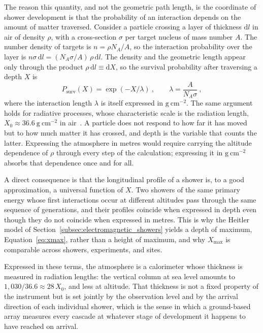 The reason this quantity, and not the geometric path length, is the coordinate of shower development is that the probability of an interaction depends on the amount of matter traversed. Consider a particle crossing a layer of thickness $\mathrm{d}l$ in air of density $\rho$, with a cross-section $\sigma$ per target nucleus of mass number $A$. The number density of targets is $n = \rho N_A / A$, so the interaction probability over the layer is $n \sigma \, \mathrm{d}l = (N_A \sigma / A) \, \rho \, \mathrm{d}l$. The density and the geometric length appear only through the product $\rho \, \mathrm{d}l \equiv \mathrm{d}X$, so the survival probability after traversing a depth $X$ is
\begin{equation}
    P_{\text{surv}}(X) = \exp\left(-X / \lambda\right) \ , \qquad \lambda = \frac{A}{N_A \sigma} \ ,
    \label{eq:interaction_length}
\end{equation}
where the interaction length $\lambda$ is itself expressed in $\mathrm{g \ cm}^{-2}$. The same argument holds for radiative processes, whose characteristic scale is the radiation length, $X_0 \approx 36.6 \ \mathrm{g \ cm}^{-2}$ in air~. A particle does not respond to how far it has moved but to how much matter it has crossed, and depth is the variable that counts the latter. Expressing the atmosphere in metres would require carrying the altitude dependence of $\rho$ through every step of the calculation; expressing it in $\mathrm{g \ cm}^{-2}$ absorbs that dependence once and for all.

A direct consequence is that the longitudinal profile of a shower is, to a good approximation, a universal function of $X$. Two showers of the same primary energy whose first interactions occur at different altitudes pass through the same sequence of generations, and their profiles coincide when expressed in depth even though they do not coincide when expressed in metres. This is why the Heitler model of Section~\ref{subsec:electromagnetic_showers} yields a depth of maximum, Equation~\ref{eq:xmax}, rather than a height of maximum, and why $X_{\text{max}}$ is comparable across showers, experiments, and sites.

Expressed in these terms, the atmosphere is a calorimeter whose thickness is measured in radiation lengths: the vertical column at sea level amounts to $1{,}030 / 36.6 \approx 28 \, X_0$, and less at altitude. That thickness is not a fixed property of the instrument but is set jointly by the observation level and by the arrival direction of each individual shower, which is the sense in which a ground-based array measures every cascade at whatever stage of development it happens to have reached on arrival.

